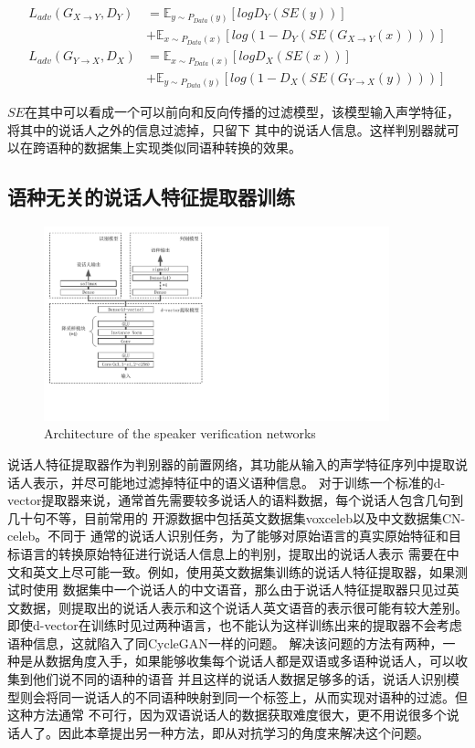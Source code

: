 \begin{align}
    L_{adv}(G_{X\rightarrow Y},D_Y) & =\mathbb{E}_{y\sim P_{Data}(y)}\left[log D_Y(SE(y))\right] \\
    & + \mathbb{E}_{x\sim P_{Data}(x)}\left[log(1-D_Y(SE(G_{X\rightarrow Y}(x))))\right] \\
    L_{adv}(G_{Y\rightarrow X},D_X) & =\mathbb{E}_{x\sim P_{Data}(x)}\left[log D_X(SE(x))\right] \\
    & + \mathbb{E}_{y\sim P_{Data}(y)}\left[log(1-D_X(SE(G_{Y\rightarrow X}(y))))\right]
\end{align}

$SE$在其中可以看成一个可以前向和反向传播的过滤模型，该模型输入声学特征，将其中的说话人之外的信息过滤掉，只留下
其中的说话人信息。这样判别器就可以在跨语种的数据集上实现类似同语种转换的效果。



\subsection{语种无关的说话人特征提取器训练}


\begin{figure}[!htp]
    \centering
    \includegraphics[width=10cm,trim=0 79 380 0,clip]{figure/5_d.pdf}
    {Architecture of the speaker verification networks}
    \label{fig:5d}
\end{figure}

说话人特征提取器作为判别器的前置网络，其功能从输入的声学特征序列中提取说话人表示，并尽可能地过滤掉特征中的语义语种信息。
对于训练一个标准的d-vector提取器来说，通常首先需要较多说话人的语料数据，每个说话人包含几句到几十句不等，目前常用的
开源数据中包括英文数据集voxceleb\cite{nagrani2017voxceleb}以及中文数据集CN-celeb\cite{fan2019cn}。不同于
通常的说话人识别任务，为了能够对原始语言的真实原始特征和目标语言的转换原始特征进行说话人信息上的判别，提取出的说话人表示
需要在中文和英文上尽可能一致。例如，使用英文数据集训练的说话人特征提取器，如果测试时使用
数据集中一个说话人的中文语音，那么由于说话人特征提取器只见过英文数据，则提取出的说话人表示和这个说话人英文语音的表示很可能有较大差别。
即使d-vector在训练时见过两种语言，也不能认为这样训练出来的提取器不会考虑语种信息，这就陷入了同CycleGAN一样的问题。
解决该问题的方法有两种，一种是从数据角度入手，如果能够收集每个说话人都是双语或多语种说话人，可以收集到他们说不同的语种的语音
并且这样的说话人数据足够多的话，说话人识别模型则会将同一说话人的不同语种映射到同一个标签上，从而实现对语种的过滤。但这种方法通常
不可行，因为双语说话人的数据获取难度很大，更不用说很多个说话人了。因此本章提出另一种方法，即从对抗学习的角度来解决这个问题。

